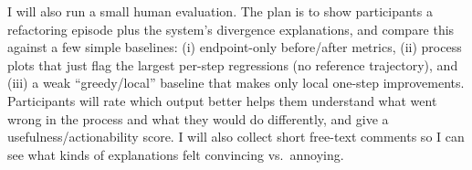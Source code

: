 I will also run a small human evaluation. The plan is to show participants a refactoring episode plus the system's divergence explanations, and compare this against a few simple baselines: (i) endpoint-only before/after metrics, (ii) process plots that just flag the largest per-step regressions (no reference trajectory), and (iii) a weak ``greedy/local'' baseline that makes only local one-step improvements. Participants will rate which output better helps them understand what went wrong in the process and what they would do differently, and give a usefulness/actionability score. I will also collect short free-text comments so I can see what kinds of explanations felt convincing vs.\ annoying.